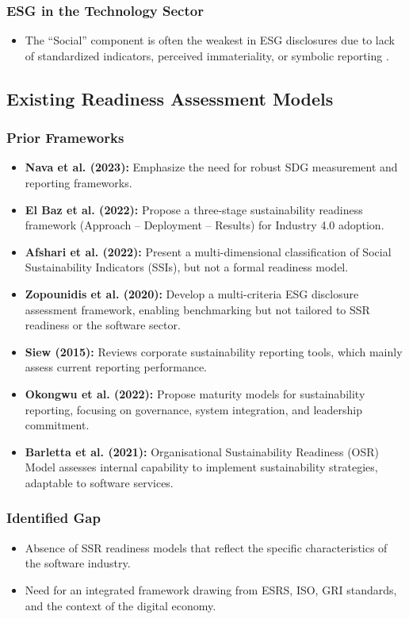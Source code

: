 \subsubsection{ESG in the Technology Sector}
\begin{itemize}
    \item The “Social” component is often the weakest in ESG disclosures due to lack of standardized indicators, perceived immateriality, or symbolic reporting \parencite{Christensen2021, Reitmaier2024}.
\end{itemize}

\subsection{Existing Readiness Assessment Models}
\subsubsection{Prior Frameworks}
\begin{itemize}
    \item \textbf{Nava et al. (2023):} Emphasize the need for robust SDG measurement and reporting frameworks.
    \item \textbf{El Baz et al. (2022):} Propose a three-stage sustainability readiness framework (Approach – Deployment – Results) for Industry 4.0 adoption.
    \item \textbf{Afshari et al. (2022):} Present a multi-dimensional classification of Social Sustainability Indicators (SSIs), but not a formal readiness model.
    \item \textbf{Zopounidis et al. (2020):} Develop a multi-criteria ESG disclosure assessment framework, enabling benchmarking but not tailored to SSR readiness or the software sector.
    \item \textbf{Siew (2015):} Reviews corporate sustainability reporting tools, which mainly assess current reporting performance.
    \item \textbf{Okongwu et al. (2022):} Propose maturity models for sustainability reporting, focusing on governance, system integration, and leadership commitment.
    \item \textbf{Barletta et al. (2021):} Organisational Sustainability Readiness (OSR) Model assesses internal capability to implement sustainability strategies, adaptable to software services.
\end{itemize}

\subsubsection{Identified Gap}
\begin{itemize}
    \item Absence of SSR readiness models that reflect the specific characteristics of the software industry.
    \item Need for an integrated framework drawing from ESRS, ISO, GRI standards, and the context of the digital economy.
\end{itemize}


